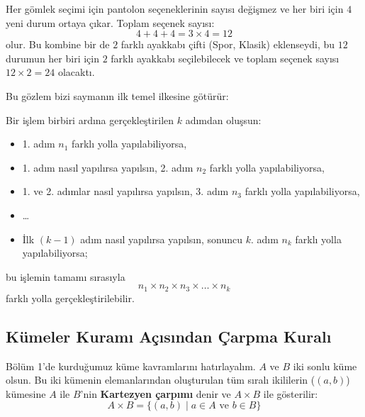 Her gömlek seçimi için pantolon seçeneklerinin sayısı değişmez ve her biri için $4$ yeni durum ortaya çıkar. Toplam seçenek sayısı:
\[ 4 + 4 + 4 = 3 \times 4 = 12 \]
olur. Bu kombine bir de $2$ farklı ayakkabı çifti (Spor, Klasik) eklenseydi, bu $12$ durumun her biri için $2$ farklı ayakkabı seçilebilecek ve toplam seçenek sayısı $12 \times 2 = 24$ olacaktı.

Bu gözlem bizi saymanın ilk temel ilkesine götürür:

\begin{definition}
Bir işlem birbiri ardına gerçekleştirilen $k$ adımdan oluşsun:
\begin{itemize}
  \item 1. adım $n_1$ farklı yolla yapılabiliyorsa,
  \item 1. adım nasıl yapılırsa yapılsın, 2. adım $n_2$ farklı yolla yapılabiliyorsa,
  \item 1. ve 2. adımlar nasıl yapılırsa yapılsın, 3. adım $n_3$ farklı yolla yapılabiliyorsa,
  \item \dots
  \item İlk $(k-1)$ adım nasıl yapılırsa yapılsın, sonuncu $k$. adım $n_k$ farklı yolla yapılabiliyorsa;
\end{itemize}
bu işlemin tamamı sırasıyla
\[ n_1 \times n_2 \times n_3 \times \dots \times n_k \]
farklı yolla gerçekleştirilebilir.
\end{definition}

\subsection{Kümeler Kuramı Açısından Çarpma Kuralı}

Bölüm 1'de kurduğumuz küme kavramlarını hatırlayalım. $A$ ve $B$ iki sonlu küme olsun. Bu iki kümenin elemanlarından oluşturulan tüm sıralı ikililerin ($ (a, b) $) kümesine $A$ ile $B$'nin \textbf{Kartezyen çarpımı} denir ve $A \times B$ ile gösterilir:
\[ A \times B = \{(a, b) \mid a \in A \text{ ve } b \in B\} \]

